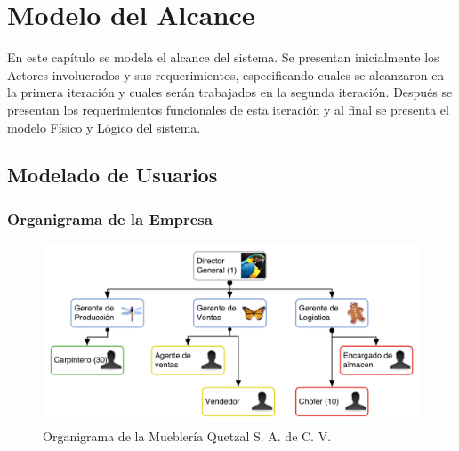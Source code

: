 \chapter{Modelo del Alcance}
\label{cap:reqUsr}

En este capítulo se modela el alcance del sistema. Se presentan inicialmente los Actores involucrados y sus requerimientos, especificando cuales se alcanzaron en la primera iteración y cuales serán trabajados en la segunda iteración. Después se presentan los requerimientos funcionales de esta iteración y al final se presenta el modelo Físico y Lógico del sistema.


\section{Modelado de Usuarios}

\subsection{Organigrama de la Empresa}



\begin{figure}[htbp]
	\begin{center}
		\includegraphics[width=.8\textwidth]{images/organigramaEm}
		\caption{Organigrama de la Mueblería Quetzal S. A. de C. V.}
		\label{fig:organigrama}
	\end{center}
\end{figure}


